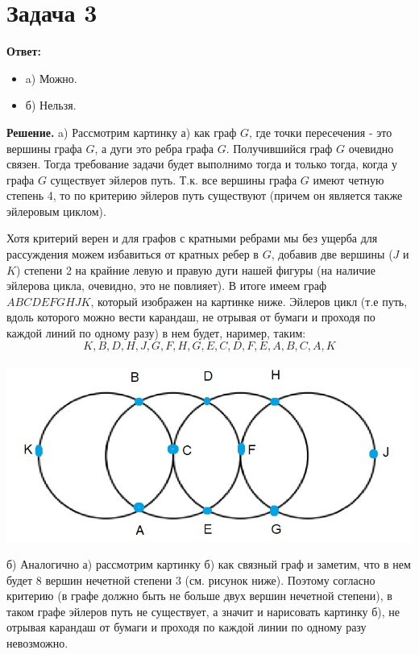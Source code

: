 \documentclass{article}
\begin{document}
\section*{Задача 3}
{\bf Ответ:}
\begin{itemize}
\item a) Можно.
\item б) Нельзя.
\end{itemize}
{\bf Решение.} a) Рассмотрим картинку а) как граф $G$, где точки пересечения - это вершины графа $G$, а дуги это ребра графа $G$. Получившийся граф $G$ очевидно связен. Тогда требование задачи будет выполнимо тогда и только тогда, когда у графа $G$ существует эйлеров путь. Т.к. все вершины графа $G$ имеют четную степень 4, то по критерию эйлеров путь существуют (причем он является также эйлеровым циклом).
\par
Хотя критерий верен и для графов с кратными ребрами мы без ущерба для рассуждения можем избавиться от кратных ребер в $G$, добавив две вершины ($J$ и $K$) степени 2 на крайние левую и правую дуги нашей фигуры (на наличие эйлерова цикла, очевидно, это не повлияет). В итоге имеем граф $ABCDEFGHJK$, который изображен на картинке ниже. Эйлеров цикл (т.е путь, вдоль которого можно вести карандаш, не отрывая от бумаги и проходя по каждой линий по одному разу) в нем будет, наример, таким: 
$$K,B,D,H,J,G,F,H,G,E,C,D,F,E,A,B,C,A,K$$
\\
{\includegraphics[scale=0.3]{img/img1.jpg}}
\par
б) Аналогично а) рассмотрим картинку б) как связный граф и заметим, что в нем будет 8 вершин нечетной степени 3 (см. рисунок ниже). Поэтому согласно критерию (в графе должно быть не больше двух вершин нечетной степени), в таком графе эйлеров путь не существует, а значит и нарисовать картинку б), не отрывая карандаш от бумаги и проходя по каждой линии по одному разу невозможно.
\\
\end{document}
